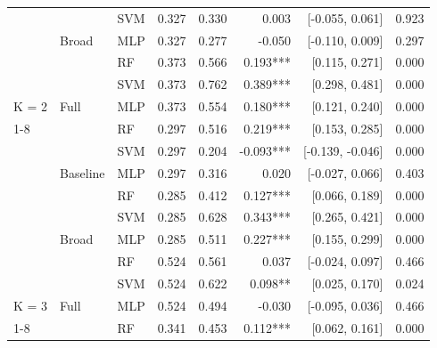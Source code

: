 \begin{table}
\begin{threeparttable}
\begin{tabular}[t]{lllrrrrr}
 &  & SVM & 0.327 & 0.330 & 0.003 & {}[-0.055, 0.061] & 0.923\\

 & \multirow[t]{-2}{*}[\normalbaselineskip]{\raggedright\arraybackslash Broad} & MLP & 0.327 & 0.277 & -0.050 & {}[-0.110, 0.009] & 0.297\\

 &  & RF & 0.373 & 0.566 & 0.193*** & {}[0.115, 0.271] & 0.000\\

 &  & SVM & 0.373 & 0.762 & 0.389*** & {}[0.298, 0.481] & 0.000\\

\multirow[t]{-8}{*}[\normalbaselineskip]{\raggedright\arraybackslash K = 2} & \multirow[t]{-2}{*}[\normalbaselineskip]{\raggedright\arraybackslash Full} & MLP & 0.373 & 0.554 & 0.180*** & {}[0.121, 0.240] & 0.000\\
\cmidrule{1-8}
 &  & RF & 0.297 & 0.516 & 0.219*** & {}[0.153, 0.285] & 0.000\\

 &  & SVM & 0.297 & 0.204 & -0.093*** & {}[-0.139, -0.046] & 0.000\\

 & \multirow[t]{-2}{*}[\normalbaselineskip]{\raggedright\arraybackslash Baseline} & MLP & 0.297 & 0.316 & 0.020 & {}[-0.027, 0.066] & 0.403\\

 &  & RF & 0.285 & 0.412 & 0.127*** & {}[0.066, 0.189] & 0.000\\

 &  & SVM & 0.285 & 0.628 & 0.343*** & {}[0.265, 0.421] & 0.000\\

 & \multirow[t]{-2}{*}[\normalbaselineskip]{\raggedright\arraybackslash Broad} & MLP & 0.285 & 0.511 & 0.227*** & {}[0.155, 0.299] & 0.000\\

 &  & RF & 0.524 & 0.561 & 0.037 & {}[-0.024, 0.097] & 0.466\\

 &  & SVM & 0.524 & 0.622 & 0.098** & {}[0.025, 0.170] & 0.024\\

\multirow[t]{-8}{*}[\normalbaselineskip]{\raggedright\arraybackslash K = 3} & \multirow[t]{-2}{*}[\normalbaselineskip]{\raggedright\arraybackslash Full} & MLP & 0.524 & 0.494 & -0.030 & {}[-0.095, 0.036] & 0.466\\
\cmidrule{1-8}
 &  & RF & 0.341 & 0.453 & 0.112*** & {}[0.062, 0.161] & 0.000\\


\end{tabular}
\end{threeparttable}
\end{table}

